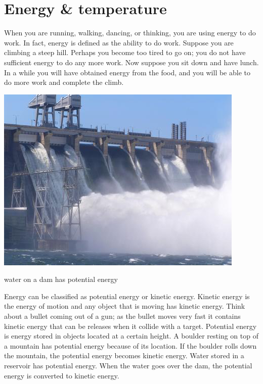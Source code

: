 \documentclass[main.tex]{subfiles}
\begin{document}
\section{Energy \& temperature}
When you are running, walking, dancing, or thinking, you are using energy to do work. In fact, energy is defined as the ability to do work. Suppose you are climbing a steep hill. Perhaps you become too tired to go on; you do not have sufficient energy to do any more work. Now suppose you sit down and have lunch. In a while you will have obtained energy from the food, and you will be able to do more work and complete the climb.
\sloppy
\begin{description}
\begin{marginfigure}
      \includegraphics{chapter2/figure1-1}
      \caption{water on a dam has potential energy}
      \label{fig:marginfig}
   \end{marginfigure}
\item[\docfilehook{Potential \& Kinetic Energy}{Potential \& Kinetic Energy}] 
Energy can be classified as potential energy or kinetic energy. 
Kinetic energy is the energy of motion and any object that is moving has kinetic energy. Think about a bullet coming out of a gun; as the bullet moves very fast it contains kinetic energy that can be releases when it collide with a target. Potential energy is energy stored in objects located at a certain height. A boulder resting on top of a mountain has potential energy because of its location. If the boulder rolls down the mountain, the potential energy becomes kinetic energy. Water stored in a reservoir has potential energy. When the water goes over the dam, the potential energy is converted to kinetic energy. 
\begin{marginfigure}

\end{marginfigure}
\end{description}
\end{document}
